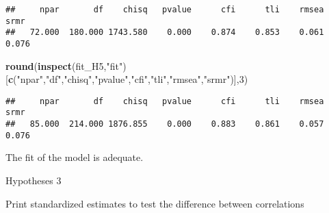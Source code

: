 \documentclass[
]{article}
\newenvironment{Shaded}{\begin{snugshade}}{\end{snugshade}}
\newcommand{\DecValTok}[1]{\textcolor[rgb]{0.00,0.00,0.81}{#1}}
\newcommand{\KeywordTok}[1]{\textcolor[rgb]{0.13,0.29,0.53}{\textbf{#1}}}
\newcommand{\NormalTok}[1]{#1}
\newcommand{\OperatorTok}[1]{\textcolor[rgb]{0.81,0.36,0.00}{\textbf{#1}}}
\newcommand{\StringTok}[1]{\textcolor[rgb]{0.31,0.60,0.02}{#1}}
\begin{document}
\begin{verbatim}
##     npar       df    chisq   pvalue      cfi      tli    rmsea     srmr 
##   72.000  180.000 1743.580    0.000    0.874    0.853    0.061    0.076
\end{verbatim}

\begin{Shaded}
\begin{Highlighting}[]
\KeywordTok{round}\NormalTok{(}\KeywordTok{inspect}\NormalTok{(fit_H5,}\StringTok{"fit"}\NormalTok{)}
\NormalTok{      [}\KeywordTok{c}\NormalTok{(}\StringTok{"npar"}\NormalTok{,}\StringTok{"df"}\NormalTok{,}\StringTok{"chisq"}\NormalTok{,}\StringTok{"pvalue"}\NormalTok{,}\StringTok{"cfi"}\NormalTok{,}\StringTok{"tli"}\NormalTok{,}\StringTok{"rmsea"}\NormalTok{,}\StringTok{"srmr"}\NormalTok{)],}\DecValTok{3}\NormalTok{)}
\end{Highlighting}
\end{Shaded}

\begin{verbatim}
##     npar       df    chisq   pvalue      cfi      tli    rmsea     srmr 
##   85.000  214.000 1876.855    0.000    0.883    0.861    0.057    0.076
\end{verbatim}

The fit of the model is adequate.

Hypotheses 3

Print standardized estimates to test the difference between correlations

\begin{Shaded}
\end{Shaded}
\end{document}
